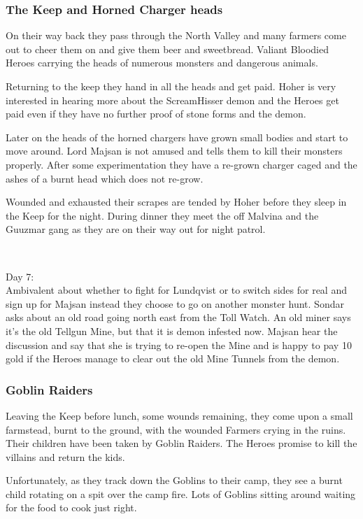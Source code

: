\subsubsection*{The Keep and Horned Charger heads}
On their way back they pass through the North Valley and many farmers come out to cheer them on and give them beer and sweetbread. Valiant Bloodied Heroes carrying the heads of numerous monsters and dangerous animals.

Returning to the keep they hand in all the heads and get paid. Hoher is very interested in hearing more about the ScreamHisser demon and the Heroes get paid even if they have no further proof of stone forms and the demon.

Later on the heads of the horned chargers have grown small bodies and start to move around. Lord Majsan is not amused and tells them to kill their monsters properly. After some experimentation they have a re-grown charger caged and the ashes of a burnt head which does not re-grow.

Wounded and exhausted their scrapes are tended by Hoher before they sleep in the Keep for the night. During dinner they meet the off Malvina and the Guuzmar gang as they are on their way out for night patrol.

\

Day 7:\\
Ambivalent about whether to fight for Lundqvist or to switch sides for real and sign up for Majsan instead they choose to go on another monster hunt. Sondar asks about an old road going north east from the Toll Watch. An old miner says it's the old Tellgun Mine, but that it is demon infested now. Majsan hear the discussion and say that she is trying to re-open the Mine and is happy to pay 10 gold if the Heroes manage to clear out the old Mine Tunnels from the demon.


\subsubsection*{Goblin Raiders}
Leaving the Keep before lunch, some wounds remaining, they come upon a small farmstead, burnt to the ground, with the wounded Farmers crying in the ruins. Their children have been taken by Goblin Raiders. The Heroes promise to kill the villains and return the kids.

Unfortunately, as they track down the Goblins to their camp, they see a burnt child rotating on a spit over the camp fire. Lots of Goblins sitting around waiting for the food to cook just right.

